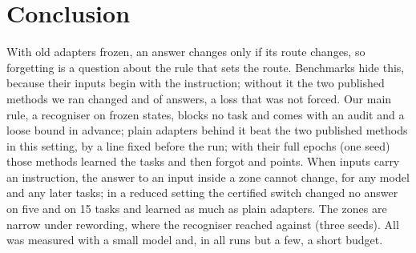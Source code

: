 \section{Conclusion}
\label{sec:conclusion}

With old adapters frozen, an answer changes only if its route changes, so forgetting is a question
about the rule that sets the route. Benchmarks hide this, because their
inputs begin with the instruction; without it the two published methods we ran changed
\AudSeedsGainloraChanged{} and \AudSeedsInfloraChanged{} of \AudSeedsCompared{} answers, a loss that was
not forced. Our main rule, a recogniser on frozen states, blocks no task and comes with an audit and a
loose bound in advance; plain adapters behind it beat the two published methods in this setting, by a
line fixed before the run; with their full epochs (one seed) those methods learned the tasks and then
forgot \AudFullGainloraFTInt{} and \AudFullInfloraFTInt{} points.
When inputs carry an instruction, the answer to an input inside a zone cannot change, for any model and
any later tasks; in a reduced setting the certified switch changed no answer on five and on 15 tasks
and learned as much as plain adapters. The zones are narrow under rewording, where the recogniser
reached \AudUThreeHeavyRidgeAPOne{} against \AudUThreeHeavyCertAPOne{} (three seeds).
All was measured with a small model and, in all runs but a few, a short budget.

